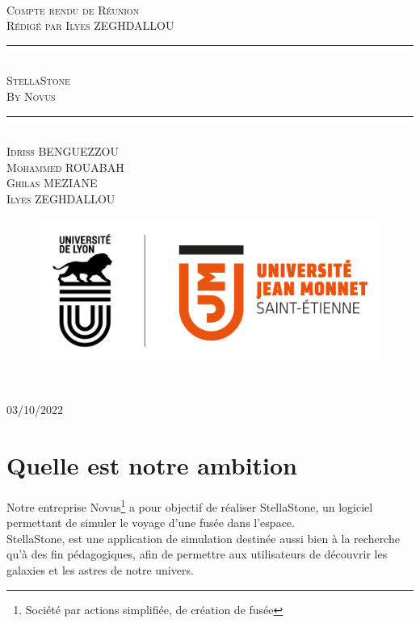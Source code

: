 \documentclass[a4paper, 12pt]{article}
\newcommand{\HRule}{\rule{\linewidth}{0.5mm}}
\begin{document}
\begin{titlepage}
  \begin{sffamily}
  \begin{center}

   
    \textsc{\LARGE }\\[2cm]

    \textsc{\Large Compte rendu de Réunion}\\[1.5cm]
    \textsc{\Medium Rédigé par Ilyes ZEGHDALLOU}

    \HRule \\[0.4cm]
    { \huge  \textsc{ StellaStone} \\
    \textsc{\Large By Novus}\\ [0.4cm] }
	

    \HRule \\[2cm]
    \textsc {Idriss BENGUEZZOU\\Mohammed ROUABAH\\Ghilas MEZIANE \\ Ilyes ZEGHDALLOU}
 \begin{figure}
     \centering
    \includegraphics[scale=0.2]{logoUJM.png}
     \label{fig:ujm_logo}
 \end{figure}
   
    \

    \vfill

    {\large {} 03/10/2022}

  \end{center}
  \end{sffamily}
\end{titlepage}


\newpage
\tableofcontents

\newpage


\section{Quelle est notre ambition}
Notre entreprise Novus\footnote{Société par actions simplifiée, de création de fusée} a pour objectif de réaliser StellaStone, un logiciel permettant de simuler le voyage d'une fusée dans l'espace. \\
StellaStone, est une application de simulation destinée aussi bien à la recherche qu'à des fin pédagogiques, afin de permettre aux utilisateurs de découvrir les galaxies et les astres de notre univers.
\end{document}
